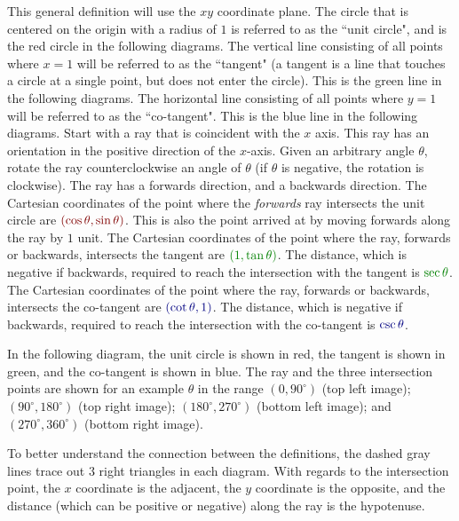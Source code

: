 \documentclass{article}
\newcommand{\dr}[1]{\textcolor{dark_red}{#1}}
\newcommand{\dg}[1]{\textcolor{dark_green}{#1}}
\newcommand{\db}[1]{\textcolor{dark_blue}{#1}}
\begin{document}
This general definition will use the \(xy\) coordinate plane. The circle that is centered on the origin with a radius of \(1\) is referred to as the ``unit circle", and is the red circle in the following diagrams. The vertical line consisting of all points where \(x = 1\) will be referred to as the ``tangent" (a tangent is a line that touches a circle at a single point, but does not enter the circle). This is the green line in the following diagrams. The horizontal line consisting of all points where \(y = 1\) will be referred to as the ``co-tangent". This is the blue line in the following diagrams. Start with a ray that is coincident with the \(x\) axis. This ray has an orientation in the positive direction of the \(x\)-axis. Given an arbitrary angle \(\theta\), rotate the ray counterclockwise an angle of \(\theta\) (if \(\theta\) is negative, the rotation is clockwise). The ray has a forwards direction, and a backwards direction. The Cartesian coordinates of the point where the \emph{forwards} ray intersects the unit circle are \(\dr{(\cos\theta, \sin\theta)}\). This is also the point arrived at by moving forwards along the ray by \(1\) unit. The Cartesian coordinates of the point where the ray, forwards or backwards, intersects the tangent are \(\dg{(1, \tan\theta)}\). The distance, which is negative if backwards, required to reach the intersection with the tangent is \(\dg{\sec\theta}\). The Cartesian coordinates of the point where the ray, forwards or backwards, intersects the co-tangent are \(\db{(\cot\theta,1)}\). The distance, which is negative if backwards, required to reach the intersection with the co-tangent is \(\db{\csc\theta}\).

In the following diagram, the unit circle is shown in red, the tangent is shown in green, and the co-tangent is shown in blue. The ray and the three intersection points are shown for an example \(\theta\) in the range \((0, 90^\circ)\) (top left image); \((90^\circ, 180^\circ)\) (top right image); \((180^\circ, 270^\circ)\) (bottom left image); and \((270^\circ, 360^\circ)\) (bottom right image).  

To better understand the connection between the definitions, the dashed gray lines trace out 3 right triangles in each diagram. With regards to the intersection point, the \(x\) coordinate is the adjacent, the \(y\) coordinate is the opposite, and the distance (which can be positive or negative) along the ray is the hypotenuse.
\end{document}
